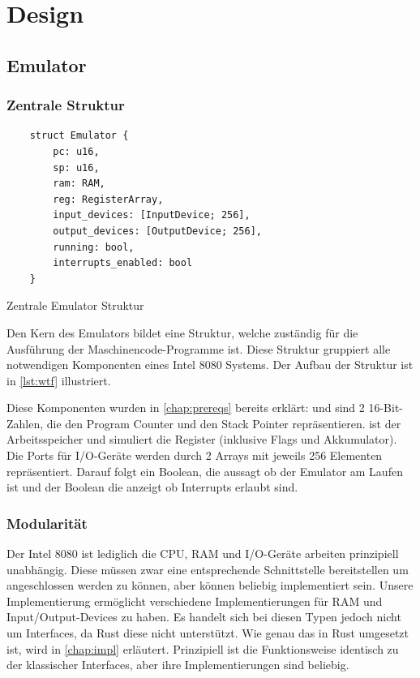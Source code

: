 \chapter{Design}\label{chap:design}

\section{Emulator}

\subsection{Zentrale Struktur}

\begin{listing}[ht]
\begin{verbatim}
    struct Emulator {
        pc: u16,
        sp: u16,
        ram: RAM,
        reg: RegisterArray,
        input_devices: [InputDevice; 256],
        output_devices: [OutputDevice; 256],
        running: bool,
        interrupts_enabled: bool
    }
\end{verbatim}
\centering
\caption{Zentrale Emulator Struktur}
\label{lst:wtf}
\end{listing}

Den Kern des Emulators bildet eine Struktur, welche zuständig für die Ausführung der Maschinencode-Programme ist. Diese Struktur gruppiert alle notwendigen Komponenten eines Intel 8080 Systems. Der Aufbau der Struktur ist in \cref{lst:wtf} illustriert.

Diese Komponenten wurden in \cref{chap:prereqs} bereits erklärt:  und  sind 2 16-Bit-Zahlen, die den Program Counter und den Stack Pointer repräsentieren.  ist der Arbeitsspeicher und  simuliert die Register (inklusive Flags und Akkumulator).
Die Ports für I/O-Geräte werden durch 2 Arrays mit jeweils 256 Elementen repräsentiert.
Darauf folgt ein Boolean, die aussagt ob der Emulator am Laufen ist und der Boolean die anzeigt ob Interrupts erlaubt sind.


\subsection{Modularität}

Der Intel 8080 ist lediglich die CPU, RAM und I/O-Geräte arbeiten prinzipiell unabhängig. Diese müssen zwar eine entsprechende Schnittstelle bereitstellen um angeschlossen werden zu können, aber können beliebig implementiert sein. Unsere Implementierung ermöglicht verschiedene Implementierungen für RAM und Input/Output-Devices zu haben. Es handelt sich bei diesen Typen jedoch nicht um Interfaces, da Rust diese nicht unterstützt. Wie genau das in Rust umgesetzt ist, wird in \cref{chap:impl} erläutert. Prinzipiell ist die Funktionsweise identisch zu der klassischer Interfaces, aber ihre Implementierungen sind beliebig.

